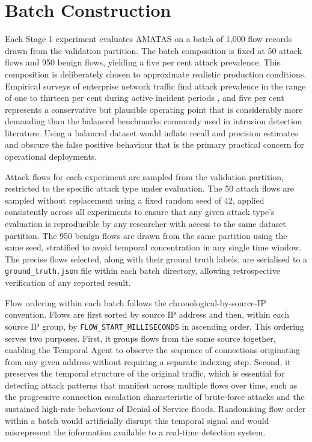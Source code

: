 \section{Batch Construction}
\label{sec:batch-construction}

Each Stage 1 experiment evaluates AMATAS on a batch of 1,000 flow records drawn from the validation partition. The batch composition is fixed at 50 attack flows and 950 benign flows, yielding a five per cent attack prevalence. This composition is deliberately chosen to approximate realistic production conditions. Empirical surveys of enterprise network traffic find attack prevalence in the range of one to thirteen per cent during active incident periods \autocite{Sommer2010}, and five per cent represents a conservative but plausible operating point that is considerably more demanding than the balanced benchmarks commonly used in intrusion detection literature. Using a balanced dataset would inflate recall and precision estimates and obscure the false positive behaviour that is the primary practical concern for operational deployments.

Attack flows for each experiment are sampled from the validation partition, restricted to the specific attack type under evaluation. The 50 attack flows are sampled without replacement using a fixed random seed of 42, applied consistently across all experiments to ensure that any given attack type's evaluation is reproducible by any researcher with access to the same dataset partition. The 950 benign flows are drawn from the same partition using the same seed, stratified to avoid temporal concentration in any single time window. The precise flows selected, along with their ground truth labels, are serialised to a \texttt{ground\_truth.json} file within each batch directory, allowing retrospective verification of any reported result.

Flow ordering within each batch follows the chronological-by-source-IP convention. Flows are first sorted by source IP address and then, within each source IP group, by \texttt{FLOW\_START\_MILLISECONDS} in ascending order. This ordering serves two purposes. First, it groups flows from the same source together, enabling the Temporal Agent to observe the sequence of connections originating from any given address without requiring a separate indexing step. Second, it preserves the temporal structure of the original traffic, which is essential for detecting attack patterns that manifest across multiple flows over time, such as the progressive connection escalation characteristic of brute-force attacks and the sustained high-rate behaviour of Denial of Service floods. Randomising flow order within a batch would artificially disrupt this temporal signal and would misrepresent the information available to a real-time detection system.

